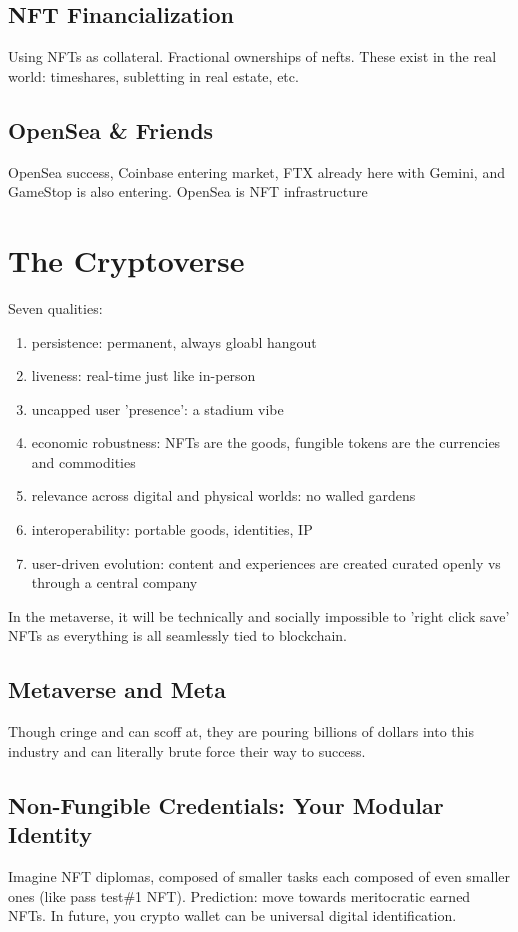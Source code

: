 \documentclass{../notes}
\begin{document}
\subsection{NFT Financialization}
Using NFTs as collateral. Fractional ownerships of nefts. These exist in the real world: timeshares, subletting in real estate, etc. 

\subsection{OpenSea \& Friends}
OpenSea success, Coinbase entering market, FTX already here with Gemini, and GameStop is also entering. OpenSea is NFT infrastructure

\section{The Cryptoverse}
Seven qualities:
\begin{enumerate}
    \item persistence: permanent, always gloabl hangout
    \item liveness: real-time just like in-person
    \item uncapped user 'presence': a stadium vibe
    \item economic robustness: NFTs are the goods, fungible tokens are the currencies and commodities
    \item relevance across digital and physical worlds: no walled gardens
    \item interoperability: portable goods, identities, IP
    \item user-driven evolution: content and experiences are created curated openly vs through a central company
\end{enumerate}

In the metaverse, it will be technically and socially impossible to 'right click save' NFTs as everything is all seamlessly tied to blockchain. 

\subsection{Metaverse and Meta}
Though cringe and can scoff at, they are pouring billions of dollars into this industry and can literally brute force their way to success. 

\subsection{Non-Fungible Credentials: Your Modular Identity}
Imagine NFT diplomas, composed of smaller tasks each composed of even smaller ones (like pass test\#1 NFT). Prediction: move towards meritocratic earned NFTs. In future, you crypto wallet can be universal digital identification. 
\end{document}
